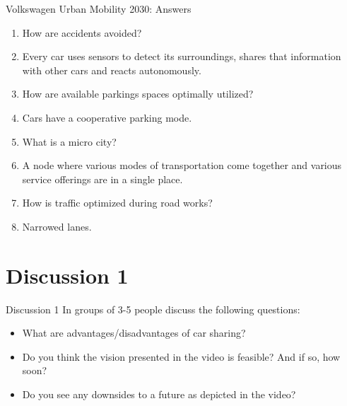 \documentclass{beamer}
\begin{document}
    \begin{frame}{Volkswagen Urban Mobility 2030: Answers}
        \begin{enumerate}[<+-|alert@+>]
            \setcounter{enumi}{\theenumTemp}
            \item
                How are accidents avoided?
            \item[]
                Every car uses sensors to detect its surroundings, shares that information with other cars and reacts autonomously.
            \item
                How are available parkings spaces optimally utilized?
            \item[]
                Cars have a cooperative parking mode.
            \item
                What is a micro city?
            \item[]
                A node where various modes of transportation come together and various service offerings are in a single place.
            \item
                How is traffic optimized during road works?
            \item[]
                Narrowed lanes.
        \end{enumerate}
    \end{frame}

    \section{Discussion 1}

    \begin{frame}{Discussion 1}
        In groups of 3-5 people discuss the following questions:

        \begin{itemize}
            \item
                What are advantages/disadvantages of car sharing?
            \item
                Do you think the vision presented in the video is feasible? And if so, how soon?
            \item
                Do you see any downsides to a future as depicted in the video?
        \end{itemize}
    \end{frame}
\end{document}
